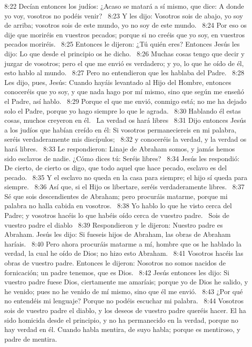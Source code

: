 8:22 Decían entonces los judíos: ¿Acaso se matará a sí mismo, que dice: A donde yo voy, vosotros no podéis venir?  
8:23 Y les dijo: Vosotros sois de abajo, yo soy de arriba; vosotros sois de este mundo, yo no soy de este mundo.  
8:24 Por eso os dije que moriréis en vuestros pecados; porque si no creéis que yo soy, en vuestros pecados moriréis.  
8:25 Entonces le dijeron: ¿Tú quién eres? Entonces Jesús les dijo: Lo que desde el principio os he dicho.  
8:26 Muchas cosas tengo que decir y juzgar de vosotros; pero el que me envió es verdadero; y yo, lo que he oído de él, esto hablo al mundo.  
8:27 Pero no entendieron que les hablaba del Padre.  
8:28 Les dijo, pues, Jesús: Cuando hayáis levantado al Hijo del Hombre, entonces conoceréis que yo soy, y que nada hago por mí mismo, sino que según me enseñó el Padre, así hablo.  
8:29 Porque el que me envió, conmigo está; no me ha dejado solo el Padre, porque yo hago siempre lo que le agrada.  
8:30 Hablando él estas cosas, muchos creyeron en él.  
La verdad os hará libres  
8:31 Dijo entonces Jesús a los judíos que habían creído en él: Si vosotros permaneciereis en mi palabra, seréis verdaderamente mis discípulos;  
8:32 y conoceréis la verdad, y la verdad os hará libres.  
8:33 Le respondieron: Linaje de Abraham somos, y jamás hemos sido esclavos de nadie. ¿Cómo dices tú: Seréis libres?  
8:34 Jesús les respondió: De cierto, de cierto os digo, que todo aquel que hace pecado, esclavo es del pecado.  
8:35 Y el esclavo no queda en la casa para siempre; el hijo sí queda para siempre.  
8:36 Así que, si el Hijo os libertare, seréis verdaderamente libres.  
8:37 Sé que sois descendientes de Abraham; pero procuráis matarme, porque mi palabra no halla cabida en vosotros.  
8:38 Yo hablo lo que he visto cerca del Padre; y vosotros hacéis lo que habéis oído cerca de vuestro padre.  
Sois de vuestro padre el diablo  
8:39 Respondieron y le dijeron: Nuestro padre es Abraham. Jesús les dijo: Si fueseis hijos de Abraham, las obras de Abraham haríais.  
8:40 Pero ahora procuráis matarme a mí, hombre que os he hablado la verdad, la cual he oído de Dios; no hizo esto Abraham.  
8:41 Vosotros hacéis las obras de vuestro padre. Entonces le dijeron: Nosotros no somos nacidos de fornicación; un padre tenemos, que es Dios.  
8:42 Jesús entonces les dijo: Si vuestro padre fuese Dios, ciertamente me amaríais; porque yo de Dios he salido, y he venido; pues no he venido de mí mismo, sino que él me envió.  
8:43 ¿Por qué no entendéis mi lenguaje? Porque no podéis escuchar mi palabra.  
8:44 Vosotros sois de vuestro padre el diablo, y los deseos de vuestro padre queréis hacer. El ha sido homicida desde el principio, y no ha permanecido en la verdad, porque no hay verdad en él. Cuando habla mentira, de suyo habla; porque es mentiroso, y padre de mentira.  
